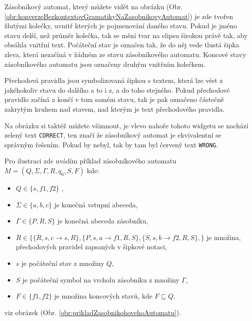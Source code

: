 
Zásobníkový automat, který můžete vidět na obrázku (Obr. \ref{obr:konverzeBezkontextovGramatikyNaZasobnikovyAutomat}) je zde tvořen žlutými kolečky, uvnitř kterých je pojmenování daného stavu. Pokud je jméno stavu delší, než průměr kolečka, tak se mění tvar na elipsu širokou právě tak, aby obsáhla vnitřní text. Počáteční stav je označen tak, že do něj vede tlustá šipka zleva, která nezačíná v žádném ze stavu zásobníkového automatu. Koncové stavy zásobníkového automatu jsou označeny druhým vnitřním kolečkem.

Přechodová pravidla jsou symbolizovaná šipkou s textem, která lze vést z jakéhokoliv stavu do dalšího a to i z, a do toho stejného. Pokud přechodové pravidlo začíná a končí v tom samém stavu, tak je pak označeno částečně zakrytým kruhem nad stavem, nad kterým je text přechodového pravidla. 

Na obrázku si taktéž můžete všimnout, je vlevo nahoře tohoto widgetu se nachází zelený text \texttt{CORRECT}, ten značí že zásobníkový automat je ekvivalentní se správným řešením. Pokud by nebyl, tak by tam byl červený text \texttt{WRONG}. 

Pro ilustraci zde uvádím příklad zásobníkového automatu \( M = (Q, \Sigma, \Gamma, R, q_0, S, F) \) kde:
\begin{itemize}
\item \( Q \in \{ s, f1, f2 \} \) ,
\item \( \Sigma \in \{ a, b, c \} \) je konečná vstupní abeceda,
\item \( \Gamma \in \{ P, R, S \} \) je konečná abeceda zásobníku,
\item \( R \in \{ \{ R, s, c \rightarrow s, R \}, \{ P,s,a \rightarrow f1, R, S \}, \{ S, s, b \rightarrow f2, R, S\}, \} \) je množina, přechodových pravidel zapsaných v šipkové notaci,
\item \( s \) je počáteční stav z množiny \( Q \),
\item \( S \) je počáteční symbol na vrcholu zásobníku z množiny \( \Gamma \),
\item \( F \in \{ f1, f2\} \) je množina koncových stavů, kde \( F \subseteq Q \).
\end{itemize}

viz obrázek (Obr. \ref{obr:prikladZasobnikohovehoAutomatu}). 


